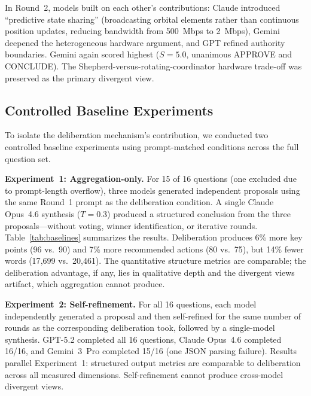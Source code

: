 \documentclass[11pt,a4paper]{article}
\begin{document}
In Round~2, models built on each other's contributions: Claude introduced ``predictive state sharing'' (broadcasting orbital elements rather than continuous position updates, reducing bandwidth from 500~Mbps to 2~Mbps), Gemini deepened the heterogeneous hardware argument, and GPT refined authority boundaries. Gemini again scored highest ($S = 5.0$, unanimous APPROVE and CONCLUDE). The Shepherd-versus-rotating-coordinator hardware trade-off was preserved as the primary divergent view.

\subsection{Controlled Baseline Experiments}
\label{sec:baselines}

To isolate the deliberation mechanism's contribution, we conducted two controlled baseline experiments using prompt-matched conditions across the full question set.

\textbf{Experiment~1: Aggregation-only.} For 15 of 16 questions (one excluded due to prompt-length overflow), three models generated independent proposals using the same Round~1 prompt as the deliberation condition. A single Claude Opus~4.6 synthesis ($T = 0.3$) produced a structured conclusion from the three proposals---without voting, winner identification, or iterative rounds. Table~\ref{tab:baselines} summarizes the results. Deliberation produces 6\% more key points (96 vs.\ 90) and 7\% more recommended actions (80 vs.\ 75), but 14\% fewer words (17{,}699 vs.\ 20{,}461). The quantitative structure metrics are comparable; the deliberation advantage, if any, lies in qualitative depth and the divergent views artifact, which aggregation cannot produce.

\textbf{Experiment~2: Self-refinement.} For all 16 questions, each model independently generated a proposal and then self-refined for the same number of rounds as the corresponding deliberation took, followed by a single-model synthesis. GPT-5.2 completed all 16 questions, Claude Opus~4.6 completed 16/16, and Gemini~3~Pro completed 15/16 (one JSON parsing failure). Results parallel Experiment~1: structured output metrics are comparable to deliberation across all measured dimensions. Self-refinement cannot produce cross-model divergent views.
\end{document}
